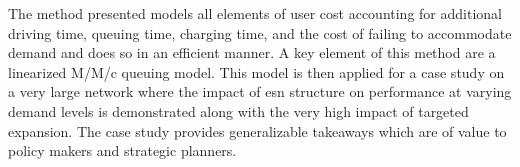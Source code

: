 The method presented models all elements of user cost accounting for additional driving time, queuing time, charging time, and the cost of failing to accommodate demand and does so in an efficient manner. A key element of this method are a linearized M/M/c queuing model. This model is then applied for a case study on a very large network where the impact of \gls{esn} structure on performance at varying demand levels is demonstrated along with the very high impact of targeted expansion. The case study provides generalizable takeaways which are of value to policy makers and strategic planners. 



